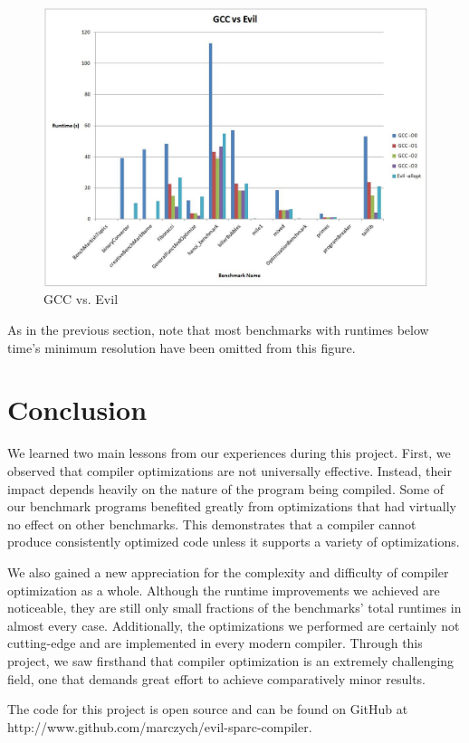 \documentclass[12pt]{article}
\begin{document}
\begin{figure}[H]
   \centering
      \includegraphics[width=\textwidth]{evil_vs_gcc.png}
   \caption{GCC vs. Evil}
   \label{fig:evilVsGcc}
\end{figure}

As in the previous section, note that most benchmarks with runtimes below time's minimum resolution have been omitted from this figure.

\section{Conclusion}
We learned two main lessons from our experiences during this project.
First, we observed that compiler optimizations are not universally effective.
Instead, their impact depends heavily on the nature of the program being compiled.
Some of our benchmark programs benefited greatly from optimizations that had virtually no effect on other benchmarks.
This demonstrates that a compiler cannot produce consistently optimized code unless it supports a variety of optimizations.

We also gained a new appreciation for the complexity and difficulty of compiler optimization as a whole.
Although the runtime improvements we achieved are noticeable, they are still only small fractions of the benchmarks' total runtimes in almost every case.
Additionally, the optimizations we performed are certainly not cutting-edge and are implemented in every modern compiler.
Through this project, we saw firsthand that compiler optimization is an extremely challenging field, one that demands great effort to achieve comparatively minor results.

The code for this project is open source and can be found on GitHub at http://www.github.com/marczych/evil-sparc-compiler.

\newpage


\end{document}
